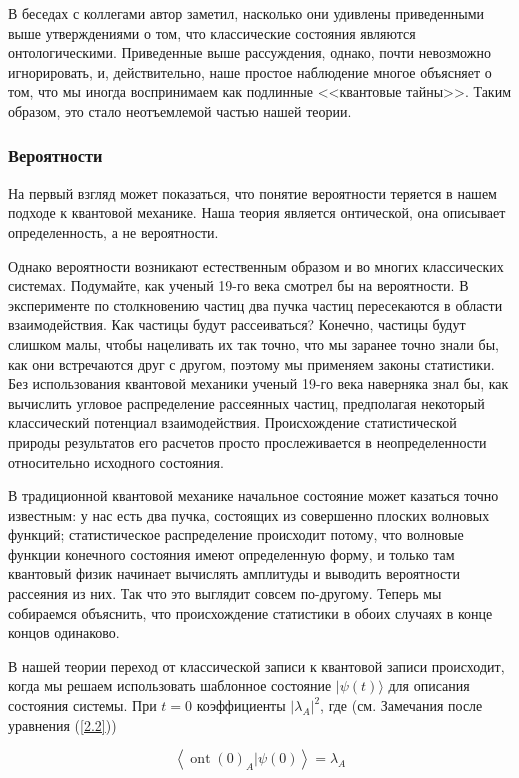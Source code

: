 \documentclass[main.tex]{subfiles}
\begin{document}
В беседах с коллегами автор заметил, насколько они удивлены приведенными выше утверждениями о том, что классические состояния являются онтологическими. Приведенные выше рассуждения, однако, почти невозможно игнорировать, и, действительно, наше простое наблюдение многое объясняет о том, что мы иногда воспринимаем как подлинные <<квантовые тайны>>. Таким образом, это стало неотъемлемой частью нашей теории.

\subsubsection{Вероятности}\label{ch4.3.2}

На первый взгляд может показаться, что понятие вероятности теряется в нашем подходе к квантовой механике. Наша теория является онтической, она описывает определенность, а не вероятности.

Однако вероятности возникают естественным образом и во многих классических системах. Подумайте, как ученый 19-го века смотрел бы на вероятности. В эксперименте по столкновению частиц два пучка частиц пересекаются в области взаимодействия. Как частицы будут рассеиваться? Конечно, частицы будут слишком малы, чтобы нацеливать их так точно, что мы заранее точно знали бы, как они встречаются друг с другом, поэтому мы применяем законы статистики. Без использования квантовой механики ученый 19-го века наверняка знал бы, как вычислить угловое распределение рассеянных частиц, предполагая некоторый классический потенциал взаимодействия. Происхождение статистической природы результатов его расчетов просто прослеживается в неопределенности относительно исходного состояния.

В традиционной квантовой механике начальное состояние может казаться точно известным: у нас есть два пучка, состоящих из совершенно плоских волновых функций; статистическое распределение происходит потому, что волновые функции конечного состояния имеют определенную форму, и только там квантовый физик начинает вычислять амплитуды и выводить вероятности рассеяния из них. Так что это выглядит совсем по-другому. Теперь мы собираемся объяснить, что происхождение статистики в обоих случаях в конце концов одинаково.

В нашей теории переход от классической записи к квантовой записи происходит, когда мы решаем использовать шаблонное состояние $|\psi(t)\rangle$ для описания состояния системы. При $t = 0$ коэффициенты $|\lambda_A|^2$, где (см. Замечания после уравнения (\ref{2.2}))

\begin{equation}\label{4.3}
	\left\langle\operatorname{ont}(0)_{A} | \psi(0)\right\rangle=\lambda_{A}
\end{equation}
\end{document}
